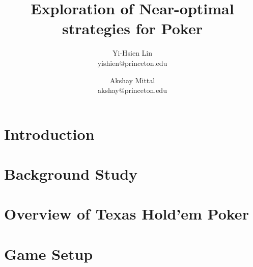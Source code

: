 \documentclass[12pt]{article}
\begin{document}
\title{Exploration of Near-optimal strategies for Poker}
\author{
	Yi-Hsien Lin \\ yishien@princeton.edu \and
	Akshay Mittal \\ akshay@princeton.edu
}
\date{}

\maketitle

\section{Introduction}

\section{Background Study}

\section{Overview of Texas Hold'em Poker}

\section{Game Setup}
\end{document}
